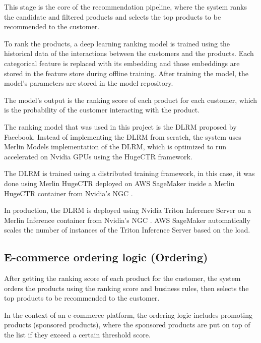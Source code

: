 This stage is the core of the recommendation pipeline, where the system ranks the candidate and filtered products and selects the top products to be recommended to the customer.

To rank the products, a deep learning ranking model is trained using the historical data of the interactions between the customers and the products.
Each categorical feature is replaced with its embedding and those embeddings are stored in the feature store during offline training. 
After training the model, the model's parameters are stored in the model repository.

The model's output is the ranking score of each product for each customer, which is the probability of the customer interacting with the product.

The ranking model that was used in this project is the DLRM \cite{facebook_dlrm} proposed by Facebook.
Instead of implementing the DLRM from scratch, 
the system uses Merlin Models \cite{MerlinModels}
 implementation of the DLRM, 
 which is optimized to run accelerated on Nvidia GPUs using the HugeCTR \cite{NvidiaHugeCTR} framework.

The DLRM is trained using a distributed training framework, in this case, it was done using Merlin HugeCTR \cite{NvidiaHugeCTR} deployed on AWS SageMaker \cite{AwsSageMaker} inside a Merlin HugeCTR container \cite{HugeCTRContainer} from Nvidia's NGC \cite{NvidiaNGC}.

In production, the DLRM is deployed using Nvidia Triton Inference Server \cite{Triton} on a Merlin Inference container \cite{NvidiaMerlinInference} from Nvidia's NGC \cite{NvidiaNGC}.
AWS SageMaker \cite{AwsSageMaker} automatically scales the number of instances of the Triton Inference Server based on the load.

\subsection{E-commerce ordering logic (Ordering)}

After getting the ranking score of each product for the customer, the system orders the products using the ranking score and business rules, 
then selects the top products to be recommended to the customer.


In the context of an e-commerce platform, the ordering logic includes promoting products (sponsored products), 
where the sponsored products are put on top of the list if they exceed a certain threshold score.

